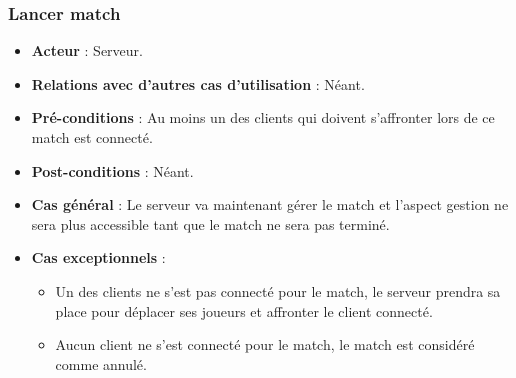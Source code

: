 \documentclass[a4paper,titlepage]{scrreprt}
\begin{document}
    \subsubsection{Lancer match}
      \begin{itemize}
        \item \textbf{Acteur}  : Serveur.
        \item \textbf{Relations avec d'autres cas d'utilisation}  : Néant.
        \item \textbf{Pré-conditions} : Au moins un des clients qui doivent s’affronter lors de ce match est connecté.
        \item \textbf{Post-conditions} : Néant.
        \item \textbf{Cas général} : Le serveur va maintenant gérer le match et l’aspect gestion ne sera plus accessible tant que le match ne sera pas terminé.
        \item \textbf{Cas exceptionnels} : 
          \begin{itemize}
            \item Un des clients ne s’est pas connecté pour le match, le serveur prendra sa place pour déplacer ses joueurs et affronter le client connecté.
			\item Aucun client ne s’est connecté pour le match, le match est considéré comme annulé.
          \end{itemize}    	
      \end{itemize}
\end{document}
